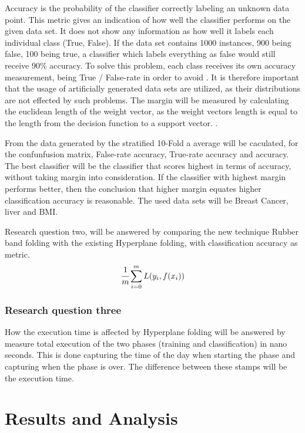 \documentclass[a4paper,twoside]{bth}
\begin{document}
 Accuracy is the probability of the classifier correctly labeling an unknown data point. This metric gives an indication of how well the classifier performs on the given data set. It does not show any information as how well it labels each individual class (True, False). If the data set contains 1000 instances, 900 being false, 100 being true, a classifier which labels everything as false would still receive 90\% accuracy. To solve this problem, each class receives its own accuracy measurement, being True / False-rate in order to avoid  \cite{Japkowicz:2011}.  It is therefore important that the usage of artificially generated data sets are utilized, as their distributions are not effected by such problems.  The margin will be measured by calculating the euclidean length of the weight vector, as the weight vectors length is equal to the length from the decision function to a support vector. \cite{Cortes:1995:SN:218919.218929, Flach:2012:MLA:2490546}. \par From the data generated by the stratified 10-Fold a average will be caculated, for the confunfusion matrix, False-rate accuracy, True-rate accuracy and accuracy. The best classifier will be the classifier that scores highest in terms of accuracy, without taking margin into consideration. If the classifier with highest margin performs better, then the conclusion that higher margin equates higher classification accuracy is reasonable. The used data sets will be Breast Cancer, liver and BMI.  \par
Research question two, will be answered by comparing the new technique Rubber band folding with the existing Hyperplane folding, with classification accuracy as metric. 
\begin{equation}\label{eq:risk}
    \cfrac{1}{m}\sum_{i=0}^{m} L(y_i, f(x_i))
\end{equation}
\subsection{Research question three} How the execution time is affected by Hyperplane folding will be answered by measure total execution of the two phases (training and classification) in nano seconds. This is done capturing the time of the day when starting the phase and capturing when the phase is over. The difference between these stamps will be the execution time. 






\chapter{Results and Analysis}
\end{document}

